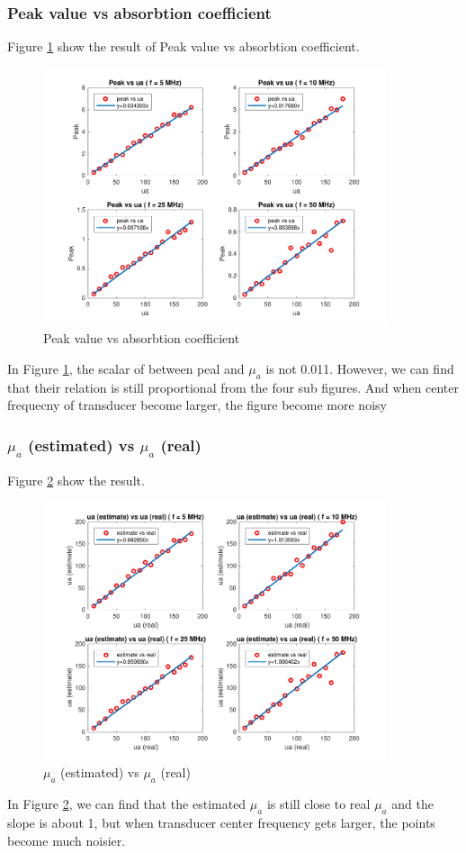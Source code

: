 \documentclass{article}
\begin{document}
\subsubsection{Peak value vs absorbtion coefficient}
Figure \ref{fig:p1f-1} show the result of Peak value vs absorbtion coefficient.
\begin{figure}[H]
    \centering
    \includegraphics[width=0.9\textwidth]{src/p1f-1.pdf}
    \caption{Peak value vs absorbtion coefficient}
    \label{fig:p1f-1}
\end{figure}
In Figure \ref{fig:p1f-1}, the scalar of between peal and $\mu_a$ is not 0.011. However, we can find that their relation is still 
proportional from the four sub figures. And when center frequecny of transducer become larger, the figure become more noisy

\subsubsection{$\mu_a$ (estimated) vs $\mu_a$ (real)}
Figure \ref{fig:p1f-2} show the result.
\begin{figure}[H]
    \centering
    \includegraphics[width=0.9\textwidth]{src/p1f-2.pdf}
    \caption{$\mu_a$ (estimated) vs $\mu_a$ (real)}
    \label{fig:p1f-2}
\end{figure}
In Figure \ref{fig:p1f-2}, we can find that the estimated $\mu_a$ is still close to real $\mu_a$ and the slope is about 1, 
but when transducer center frequency gets larger, the points become much noisier.
\end{document}
